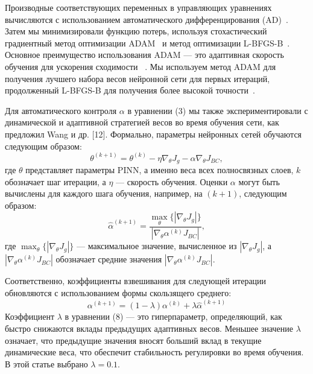 \documentclass[a4paper,12pt]{article}
\theoremstyle{plain} %
\theoremstyle{definition} %
\theoremstyle{remark} %
\begin{document}
Производные соответствующих переменных в управляющих уравнениях вычисляются с использованием автоматического дифференцирования (AD)~\cite{baydin2018automatic}. Затем мы минимизировали функцию потерь, используя стохастический градиентный метод оптимизации ADAM~\cite{kingma2014adam} и метод оптимизации L-BFGS-B~\cite{byrd1995limited}. Основное преимущество использования ADAM — это адаптивная скорость обучения для ускорения сходимости~\cite{kingma2014adam} . Мы используем метод ADAM для получения лучшего набора весов нейронной сети для первых итераций, продолженный L-BFGS-B для получения более высокой точности~\cite{liu1989limited}.

Для автоматического контроля $\alpha$ в уравнении (3) мы также экспериментировали с динамической и адаптивной стратегией весов во время обучения сети, как предложил Wang и др. [12]. Формально, параметры нейронных сетей обучаются следующим образом:
\begin{equation}
\theta^{(k+1)} = \theta^{(k)} - \eta \nabla_\theta J_g - \alpha \nabla_\theta J_{BC},
\end{equation}
где $\theta$ представляет параметры PINN, а именно веса всех полносвязных слоев, $k$ обозначает шаг итерации, а $\eta$ — скорость обучения. Оценки $\alpha$ могут быть вычислены для каждого шага обучения, например, на $(k+1)$, следующим образом:
\begin{equation}
\hat{\alpha}^{(k+1)} = \frac{\max_\theta \{|\nabla_\theta J_g|\}}{|\nabla_\theta \alpha^{(k)} J_{BC}|},
\end{equation}
где $\max_\theta \{|\nabla_\theta J_g|\}$ — максимальное значение, вычисленное из $|\nabla_\theta J_g|$, а $|\nabla_\theta \alpha^{(k)} J_{BC}|$ обозначает средние значения $|\nabla_\theta \alpha^{(k)} J_{BC}|$.

Соответственно, коэффициенты взвешивания для следующей итерации обновляются с использованием формы скользящего среднего:
\begin{equation}
\alpha^{(k+1)} = (1 - \lambda) \alpha^{(k)} + \lambda \hat{\alpha}^{(k+1)}
\end{equation}
Коэффициент $\lambda$ в уравнении (8) — это гиперпараметр, определяющий, как быстро снижаются вклады предыдущих адаптивных весов. Меньшее значение $\lambda$ означает, что предыдущие значения вносят больший вклад в текущие динамические веса, что обеспечит стабильность регулировки во время обучения. В этой статье выбрано $\lambda = 0.1$.
\end{document}
